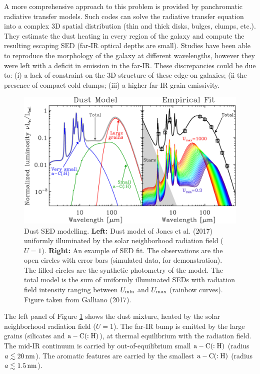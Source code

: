\documentclass[a4paper,10pt]{article}
\begin{document}
{\noindent}A more comprehensive approach to this problem is provided by panchromatic radiative transfer models. Such codes can solve the radiative transfer equation into a complex 3D spatial distribution (thin and thick disks, bulges, clumps, etc.). They estimate the dust heating in every region of the galaxy and compute the resulting escaping SED (far-IR optical depths are small). Studies have been able to reproduce the morphology of the galaxy at different wavelengths, however they were left with a deficit in emission in the far-IR. These discrepancies could be due to: (i) a lack of constraint on the 3D structure of these edge-on galaxies; (ii the presence of compact cold clumps; (iii) a higher far-IR grain emissivity.

\begin{figure}[t]
    \centering
    \includegraphics[width=14cm]{figures/GalaxySED_model.jpg}
    \caption{\footnotesize{Dust SED modelling. \textbf{Left:} Dust model of Jones et al. (2017) uniformly illuminated by the solar neighborhood radiation field ($U=1$). \textbf{Right:} An example of SED fit. The observations are the open circles with error bars (simulated data, for demonstration). The filled circles are the synthetic photometry of the model. The total model is the sum of uniformly illuminated SEDs with radiation field intensity ranging between $U_{\rm min}$ and $U_{\rm max}$ (rainbow curves). Figure taken from Galliano (2017).}}
    \label{fig:galaxySEDmodel}
\end{figure}

{\noindent}The left panel of Figure \ref{fig:galaxySEDmodel} shows the dust mixture, heated by the solar neighborhood radiation field ($U=1$). The far-IR bump is emitted by the large grains (silicates and ${\rm a-C(:H)}$), at thermal equilibrium with the radiation field. The mid-IR continuum is carried by out-of-equilibrium small ${\rm a-C(:H)}$ (radius  $a\lesssim20\,{\rm nm}$). The aromatic features are carried by the smallest ${\rm a-C(:H)}$ (radius $a\lesssim1.5\,{\rm nm}$).
\end{document}
